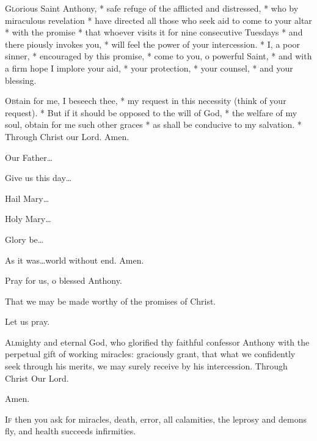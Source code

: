 {\centering\Large{\MakeUppercase{}}\par}

\begin{enpars}


\lettrine{G}{l}orious Saint Anthony, * safe refuge of the afflicted and distressed, * who by miraculous revelation * have directed all those who seek aid to come to your altar * with the promise * that whoever visits it for nine consecutive Tuesdays * and there piously invokes you, * will feel the power of your intercession. * I, a poor sinner, * encouraged by this promise, * come to you, o powerful Saint, * and with a firm hope I implore your aid, * your protection, * your counsel, * and your blessing.

\lettrine{O}{b}tain for me, I beseech thee, * my request in this necessity (think of your request). * But if it should be opposed to the will of God, * the welfare of my soul, obtain for me such other graces * as shall be conducive to my salvation. * Through Christ our Lord. Amen.

\vv Our Father…

\rr Give us this day…

\vv Hail Mary…

\rr Holy Mary…

\vv Glory be…

\rr As it was…world without end. Amen.

\vv Pray for us, o blessed Anthony.

\rr That we may be made worthy of the promises of Christ.


Let us pray.

\lettrine{A}{l}mighty and eternal God, who glorified thy faithful confessor Anthony with the perpetual gift of working miracles: graciously grant, that what we confidently seek through his merits, we may surely receive by his intercession. Through Christ Our Lord.

\rr Amen.



\lettrine{I}{f} then you ask for miracles,
death, error, all calamities,
the leprosy and demons fly,
and health succeeds infirmities.


\end{enpars}

